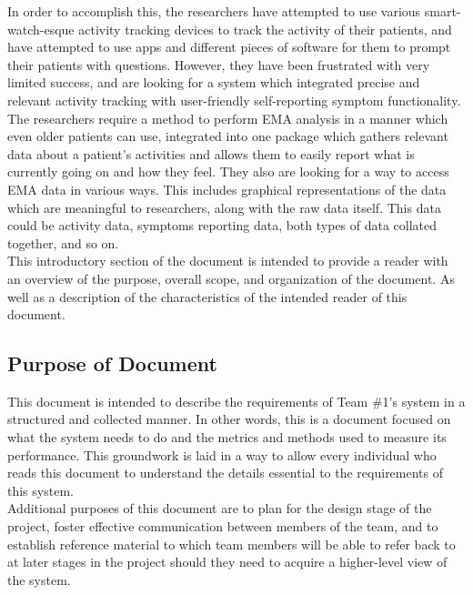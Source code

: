 \documentclass[12pt]{article}
\begin{document}
In order to accomplish this, the researchers have attempted to use various smart-watch-esque activity tracking devices to track the activity of their patients, and have attempted to use apps and different pieces of software for them to prompt their patients with questions. However, they have been frustrated with very limited success, and are looking for a system which integrated precise and relevant activity tracking with user-friendly self-reporting symptom functionality.\\

The researchers require a method to perform EMA analysis in a manner which even older patients can use, integrated into one package which gathers relevant data about a patient's activities and allows them to easily report what is currently going on and how they feel. They also are looking for a way to access EMA data in various ways. This includes graphical representations of the data which are meaningful to researchers, along with the raw data itself. This data could be activity data, symptoms reporting data, both types of data collated together, and so on. \\


This introductory section of the document is intended to provide a reader with an overview of the purpose, overall scope, and organization of the document. As well as a description of the characteristics of the intended reader of this document.\\

\subsection{Purpose of Document}

This document is intended to describe the requirements of Team \#1's system in a structured and collected manner. In other words, this is a document focused on what the system needs to do and the metrics and methods used to measure its performance. This groundwork is laid in a way to allow every individual who reads this document to understand the details essential to the requirements of this system.\\

Additional purposes of this document are to plan for the design stage of the project, foster effective communication between members of the team, and to establish reference material to which team members will be able to refer back to at later stages in the project should they need to acquire a higher-level view of the system.
\end{document}
